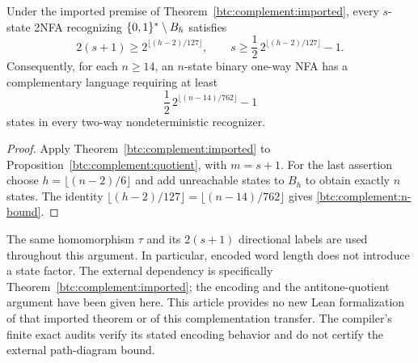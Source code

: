 \begin{theorem}
\label{btc:complement:binary}
Under the imported premise of Theorem~\ref{btc:complement:imported},
every $s$-state 2NFA recognizing $\{0,1\}^*\setminus B_h$ satisfies
\begin{equation}\label{btc:complement:state-bound}
 2(s+1)\ge2^{\lfloor(h-2)/127\rfloor},\qquad
 s\ge\frac12\,2^{\lfloor(h-2)/127\rfloor}-1.
\end{equation}
Consequently, for each $n\ge14$, an $n$-state binary one-way NFA has
a complementary language requiring at least
\begin{equation}\label{btc:complement:n-bound}
 \frac12\,2^{\lfloor(n-14)/762\rfloor}-1
\end{equation}
states in every two-way nondeterministic recognizer.
\end{theorem}

\begin{proof}
Apply Theorem~\ref{btc:complement:imported} to
Proposition~\ref{btc:complement:quotient}, with $m=s+1$.
For the last assertion choose $h=\lfloor(n-2)/6\rfloor$ and add
unreachable states to $B_h$ to obtain exactly $n$ states.
The identity
$\lfloor(h-2)/127\rfloor=\lfloor(n-14)/762\rfloor$
gives \eqref{btc:complement:n-bound}.
\end{proof}

The same homomorphism $\tau$ and its $2(s+1)$ directional labels are
used throughout this argument. In particular, encoded word length
does not introduce a state factor. The external dependency is
specifically Theorem~\ref{btc:complement:imported}; the encoding and
the antitone-quotient argument have been given here. This article
provides no new Lean formalization of that imported theorem or of
this complementation transfer. The compiler's finite exact audits
verify its stated encoding behavior and do not certify the external
path-diagram bound.

